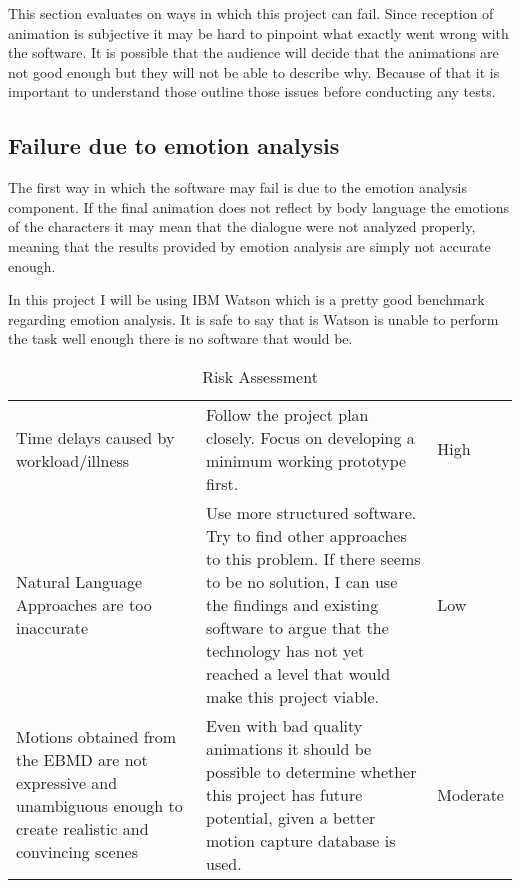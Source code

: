 This section evaluates on ways in which this project can fail. Since reception of animation is subjective it may be hard to pinpoint what exactly went wrong with the software. It is possible that the audience will decide that the animations are not good enough but they will not be able to describe why. Because of that it is important to understand those outline those issues before conducting any tests.

\subsection{Failure due to emotion analysis}
The first way in which the software may fail is due to the emotion analysis component. If the final animation does not reflect by body language the emotions of the characters it may mean that the dialogue were not analyzed properly, meaning that the results provided by emotion analysis are simply not accurate enough.

In this project I will be using IBM Watson which is a pretty good benchmark regarding emotion analysis. It is safe to say that is Watson is unable to perform the task well enough there is no software that would be. 


\begin{table}[!ht]
	\centering
	\small
	
	\begin{tabular}{ |p{11em} |p{23.8em}|p{4em}| }
	 \hline
		\thead{Risk} & \thead{Mitigation} & \thead{Level} \\
	 \hline
	 	Time delays caused by workload/illness & Follow the project plan closely. Focus on developing a minimum working prototype first. & High \\
	 \hline
		Natural Language Approaches are too inaccurate & Use more structured software. Try to find other approaches to this problem. If there seems to be no solution, I can use the findings and existing software to argue that the technology has not yet reached a level that would make this project viable.  &  Low \\
	\hline
		Motions obtained from the EBMD are not expressive and unambiguous enough to create realistic and convincing scenes & Even with bad quality animations it should be possible to determine whether this project has future potential, given a better motion capture database is used. & Moderate \\
	\hline
	\end{tabular}

	 \caption{Risk Assessment}
	 \label{tab:riskassessment}
	 
\end{table}